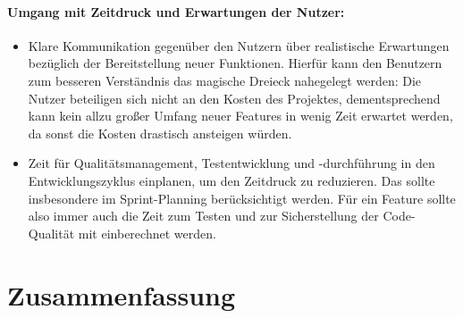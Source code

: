 \subsubsection*{Umgang mit Zeitdruck und Erwartungen der Nutzer:}

\begin{itemize}
	\item Klare Kommunikation gegenüber den Nutzern über realistische Erwartungen bezüglich der Bereitstellung neuer Funktionen.
	Hierfür kann den Benutzern zum besseren Verständnis das magische Dreieck nahegelegt werden: 
	Die Nutzer beteiligen sich nicht an den Kosten des Projektes, dementsprechend kann kein allzu großer Umfang neuer 
	Features in wenig Zeit erwartet werden, da sonst die Kosten drastisch ansteigen würden. 
	\item Zeit für Qualitätsmanagement, Testentwicklung und -durchführung in den Entwicklungszyklus einplanen, um den Zeitdruck zu reduzieren.
	Das sollte insbesondere im Sprint-Planning berücksichtigt werden. Für ein Feature sollte also immer auch die Zeit zum Testen 
	und zur Sicherstellung der Code-Qualität mit einberechnet werden. 
\end{itemize}

\chapter{Zusammenfassung}